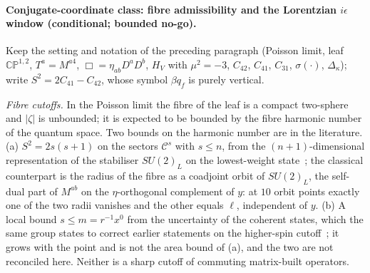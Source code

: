 \paragraph{Conjugate-coordinate class: fibre admissibility and the Lorentzian \(i\epsilon\) window (conditional; bounded no-go).}
Keep the setting and notation of the preceding paragraph (Poisson limit, leaf \(\mathbb{CP}^{1,2}\), \(T^a=M^{a4}\), \(\Box=\eta_{ab}D^aD^b\), \(H_V\) with \(\mu^2=-3\), \(C_{42}\), \(C_{41}\), \(C_{31}\), \(\sigma(\cdot)\), \(\Delta_\kappa\)); write \(S^2=2C_{41}-C_{42}\), whose symbol \(\beta q_f\) is purely vertical.

\emph{Fibre cutoffs.} In the Poisson limit the fibre of the leaf is a compact two-sphere and \(|\zeta|\) is unbounded; it is expected to be bounded by the fibre harmonic number of the quantum space. Two bounds on the harmonic number are in the literature. (a) \(S^2=2s(s+1)\) on the sectors \(\mathcal C^s\) with \(s\le n\), from the \((n+1)\)-dimensional representation of the stabiliser \(SU(2)_L\) on the lowest-weight state~\cite{Steinacker2019NoGhost}; the classical counterpart is the radius of the fibre as a coadjoint orbit of \(SU(2)_L\), the self-dual part of \(M^{ab}\) on the \(\eta\)-orthogonal complement of \(y\): at \(10\) orbit points exactly one of the two radii vanishes and the other equals \(\ell\), independent of \(y\). (b) A local bound \(s\le m=r^{-1}x^0\) from the uncertainty of the coherent states, which the same group states to correct earlier statements on the higher-spin cutoff~\cite{MantaSteinacker2025}; it grows with the point and is not the area bound of (a), and the two are not reconciled here. Neither is a sharp cutoff of commuting matrix-built operators.

